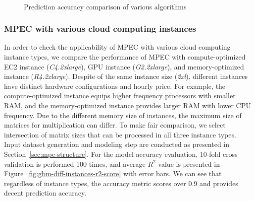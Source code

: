 \documentclass[10pt, conference, compsocconf]{IEEEtran}
\begin{document}
\begin{figure}[t]
  \centering
  \\
   \hfil {}
  \caption{\label{fig:algorithm-comparison}Prediction accuracy comparison of various algorithms}
\end{figure}

\subsubsection{MPEC with various cloud computing instances}
In order to check the applicability of MPEC with various cloud computing instance types, we compare the performance of MPEC with compute-optimized EC2 instance (\textit{C4.2xlarge}), GPU instance (\textit{G2.2xlarge}), and memory-optimized instance (\textit{R4.2xlarge}). Despite of the same instance size (\textit{2xl}), different instances have distinct hardware configurations and hourly price. For example, the compute-optimized instance equips higher frequency processors with smaller RAM, and the memory-optimized instance provides larger RAM with lower CPU frequency. Due to the different memory size of instances, the maximum size of matrices for multiplication can differ. To make fair comparison, we select intersection of matrix sizes that can be processed in all three instance types. Input dataset generation and modeling step are conducted as presented in Section~\ref{sec:mpc-structure}. For the model accuracy evaluation, 10-fold cross validation is performed 100 times, and average $R^2$ value is presented in Figure~\ref{fig:gbm-diff-instances-r2-score} with error bars. We can see that regardless of instance types, the accuracy metric scores over $0.9$ and provides decent prediction accuracy.
\end{document}
